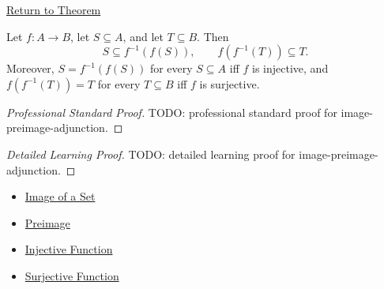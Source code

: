 \newpage
{}
\label{prf:image-preimage-adjunction}

\begin{remark*}[Return]
\hyperref[thm:image-preimage-adjunction]{Return to Theorem}
\end{remark*}

\begin{theorem*}
Let $f:A\to B$, let $S\subseteq A$, and let $T\subseteq B$. Then
\[
S\subseteq f^{-1}(f(S)),
\qquad
f(f^{-1}(T))\subseteq T.
\]
Moreover, $S=f^{-1}(f(S))$ for every $S\subseteq A$ iff $f$ is injective, and
$f(f^{-1}(T))=T$ for every $T\subseteq B$ iff $f$ is surjective.
\end{theorem*}

\begin{proof}[Professional Standard Proof]
\LRAProofBodyStart
TODO: professional standard proof for image-preimage-adjunction.
\end{proof}

\begin{proof}[Detailed Learning Proof]
\LRAProofBodyStart
TODO: detailed learning proof for image-preimage-adjunction.
\end{proof}

\begin{remark*}

\end{remark*}

\begin{dependencies}
\begin{itemize}
  \item \hyperref[def:image-set]{Image of a Set}
  \item \hyperref[def:preimage]{Preimage}
  \item \hyperref[def:injective]{Injective Function}
  \item \hyperref[def:surjective]{Surjective Function}
\end{itemize}
\end{dependencies}

\clearpage
